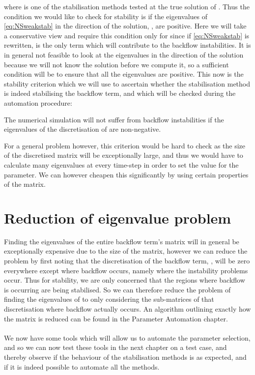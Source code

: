 where  is one of the stabilisation methods tested at the true solution of \bmu. Thus the condition we would like to check for stability is if the eigenvalues of \autoref{eq:NSweakstab} in the direction of the solution, \bmu, are positive. Here we will take a conservative view and require this condition only for  since if \autoref{eq:NSweakstab} is rewritten,  is the only term which will contribute to the backflow instabilities. It is in general not feasible to look at the eigenvalues in the direction of the solution because we will not know the solution before we compute it, so a sufficient condition will be to ensure that all the eigenvalues are positive. This now is the stability criterion which we will use to ascertain whether the stabilisation method is indeed stabilising the backflow term, and which will be checked during the automation procedure:
\theoremstyle{definition}
\begin{criterion}
The numerical simulation will not suffer from backflow instabilities if the eigenvalues of the discretisation of  are non-negative.
\end{criterion}
For a general problem however, this criterion would be hard to check as the size of the discretised matrix will be exceptionally large, and thus we would have to calculate many eigenvalues at every time-step in order to set the value for the parameter. We can however cheapen this significantly by using certain properties of the matrix.


\section{Reduction of eigenvalue problem}

Finding the eigenvalues of the entire backflow term's matrix will in general be exceptionally expensive due to the size of the matrix, however we can reduce the problem by first noting that the discretisation of the backflow term, , will be zero everywhere except where backflow occurs, namely where the instability problems occur. Thus for stability, we are only concerned that the regions where backflow is occurring are being stabilised. So we can therefore reduce the problem of finding the eigenvalues of  to only considering the sub-matrices of that discretisation where backflow actually occurs. An algorithm outlining exactly how the matrix is reduced can be found in the Parameter Automation chapter.\\
\\
We now have some tools which will allow us to automate the parameter selection, and so we can now test these tools in the next chapter on a test case, and thereby observe if the behaviour of the stabilisation methods is as expected, and if it is indeed possible to automate all the methods.